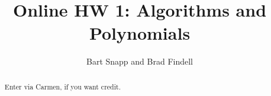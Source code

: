 \documentclass[handout,space,nooutcomes]{xourse}
\title{Online HW 1: Algorithms and Polynomials}
\author{Bart Snapp and Brad Findell}
\begin{document}
\begin{abstract}
Enter via Carmen, if you want credit.  
\end{abstract}
\maketitle

\end{document}
